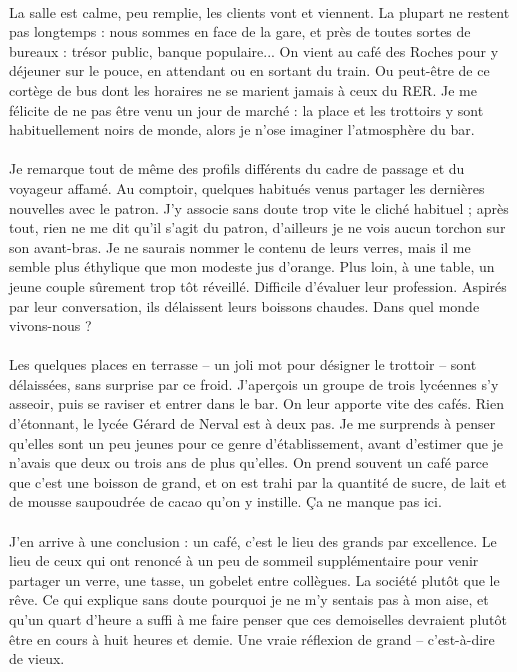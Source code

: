 \paragraph{}
La salle est calme, peu remplie, les clients vont et viennent. La plupart ne
restent pas longtemps : nous sommes en face de la gare, et près de toutes
sortes de bureaux : trésor public, banque populaire... On vient au café des
Roches pour y déjeuner sur le pouce, en attendant ou en sortant du train. Ou
peut-être de ce cortège de bus dont les horaires ne se marient jamais à ceux du
RER. Je me félicite de ne pas être venu un jour de marché : la place et les
trottoirs y sont habituellement noirs de monde, alors je n’ose imaginer
l’atmosphère du bar.

\paragraph{}
Je remarque tout de même des profils différents du cadre de passage et du
voyageur affamé. Au comptoir, quelques habitués venus partager les dernières
nouvelles avec le patron. J’y associe sans doute trop vite le cliché habituel ;
après tout, rien ne me dit qu’il s’agit du patron, d’ailleurs je ne vois aucun
torchon sur son avant-bras. Je ne saurais nommer le contenu de leurs verres,
mais il me semble plus éthylique que mon modeste jus d’orange. Plus loin, à une
table, un jeune couple sûrement trop tôt réveillé. Difficile d’évaluer leur
profession. Aspirés par leur conversation, ils délaissent leurs boissons
chaudes. Dans quel monde vivons-nous ?

\paragraph{}
Les quelques places en terrasse – un joli mot pour désigner le trottoir – sont
délaissées, sans surprise par ce froid.  J’aperçois un groupe de trois
lycéennes s’y asseoir, puis se raviser et entrer dans le bar. On leur apporte
vite des cafés. Rien d’étonnant, le lycée Gérard de Nerval est à deux pas. Je
me surprends à penser qu’elles sont un peu jeunes pour ce genre
d’établissement, avant d’estimer que je n’avais que deux ou trois ans de plus
qu’elles. On prend souvent un café parce que c’est une boisson de grand, et on
est trahi par la quantité de sucre, de lait et de mousse saupoudrée de cacao
qu’on y instille. Ça ne manque pas ici.

\paragraph{}
J’en arrive à une conclusion : un café, c’est le lieu des grands par
excellence. Le lieu de ceux qui ont renoncé à un peu de sommeil supplémentaire
pour venir partager un verre, une tasse, un gobelet entre collègues. La société
plutôt que le rêve. Ce qui explique sans doute pourquoi je ne m’y sentais pas à
mon aise, et qu’un quart d’heure a suffi à me faire penser que ces demoiselles
devraient plutôt être en cours à huit heures et demie. Une vraie réflexion de
grand – c’est-à-dire de vieux.

